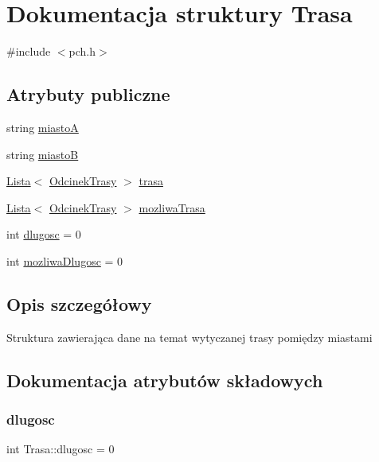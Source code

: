\hypertarget{struct_trasa}{}\section{Dokumentacja struktury Trasa}
\label{struct_trasa}


{\ttfamily \#include $<$pch.\+h$>$}

\subsection*{Atrybuty publiczne}
\begin{DoxyCompactItemize}
\item 
string \mbox{\hyperlink{struct_trasa_ab7c0cbfac427d219304c268ed1619cf9}{miastoA}}
\item 
string \mbox{\hyperlink{struct_trasa_a007c4abb2e5790f364766d3e8faa57d2}{miastoB}}
\item 
\mbox{\hyperlink{class_lista}{Lista}}$<$ \mbox{\hyperlink{struct_odcinek_trasy}{Odcinek\+Trasy}} $>$ \mbox{\hyperlink{struct_trasa_a187b2dcd9d158f54b549e15a1b12ff02}{trasa}}
\item 
\mbox{\hyperlink{class_lista}{Lista}}$<$ \mbox{\hyperlink{struct_odcinek_trasy}{Odcinek\+Trasy}} $>$ \mbox{\hyperlink{struct_trasa_addd78216be21eac061f507eb653a05b5}{mozliwa\+Trasa}}
\item 
int \mbox{\hyperlink{struct_trasa_adb6dfc9c3a7206f45d21cbdb1d02ae35}{dlugosc}} = 0
\item 
int \mbox{\hyperlink{struct_trasa_ad2cc10d999b3728f994a98dbfd447c6a}{mozliwa\+Dlugosc}} = 0
\end{DoxyCompactItemize}


\subsection{Opis szczegółowy}
Struktura zawierająca dane na temat wytyczanej trasy pomiędzy miastami 

\subsection{Dokumentacja atrybutów składowych}
\mbox{\label{struct_trasa_adb6dfc9c3a7206f45d21cbdb1d02ae35}} 
\subsubsection{\texorpdfstring{dlugosc}{dlugosc}}
{\footnotesize\ttfamily int Trasa\+::dlugosc = 0}

